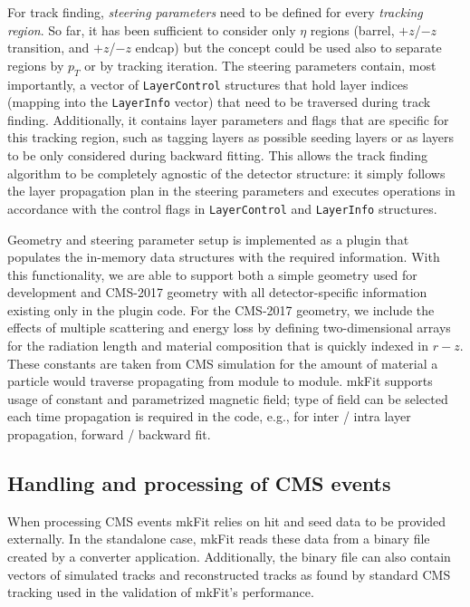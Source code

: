 \documentclass{webofc}
\def\mkfit{mkFit\xspace}
\def\stt#1{{\small\texttt{#1}}}
\begin{document}
For track finding, \emph{steering parameters} need to be defined for every
\emph{tracking region}. So far, it has been sufficient to consider only $\eta$
regions (barrel, $+z$/$-z$ transition, and $+z$/$-z$ endcap) but the concept
could be used also to separate regions by $p_T$ or by tracking iteration. The
steering parameters contain, most importantly, a vector of \stt{LayerControl}
structures that hold layer indices (mapping into the \stt{LayerInfo} vector)
that need to be traversed during track finding. Additionally, it contains
layer parameters and flags that are specific for this tracking region, such as
tagging layers as possible seeding layers or as layers to be only considered
during backward fitting. This allows the track finding algorithm to be completely
agnostic of the detector structure: it simply follows the layer propagation
plan in the steering parameters and executes operations in accordance with the
control flags in \stt{LayerControl} and \stt{LayerInfo} structures.

Geometry and steering parameter setup is implemented as a plugin that
populates the in-memory data structures with the required information. With
this functionality, we are able to support both a simple geometry used for development and
CMS-2017 geometry with all detector-specific information existing only in the
plugin code. For the CMS-2017 geometry, we include the effects of multiple
scattering and energy loss by defining two-dimensional arrays for the
radiation length and material composition that is quickly indexed in
$r-z$. These constants are taken from CMS simulation for the amount of
material a particle would traverse propagating from module to module. \mkfit
supports usage of constant and parametrized magnetic field; type of field can
be selected each time propagation is required in the code, e.g., for inter /
intra layer propagation, forward / backward fit.

\subsection{Handling and processing of CMS events}
\label{ssec:cms-event-processing}

When processing CMS events \mkfit relies on hit and seed data to be provided
externally. In the standalone case, \mkfit reads these data from a binary file
created by a converter application. Additionally, the binary file can also 
contain vectors of simulated tracks and reconstructed tracks as found by 
standard CMS tracking used in the validation of \mkfit's performance.
\end{document}
